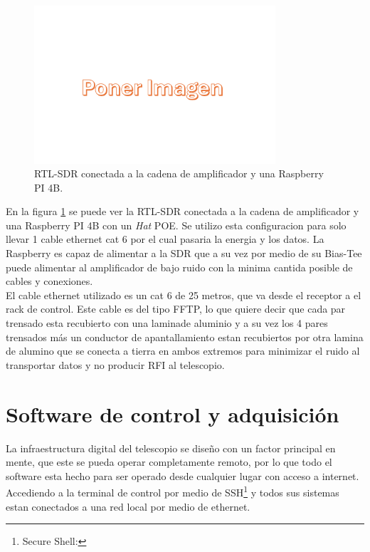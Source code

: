 \begin{figure}
    \centering
    \includegraphics[width=0.8\textwidth]{img/imagen}
    \caption{RTL-SDR conectada a la cadena de amplificador y una Raspberry PI 4B.}
    \label{fig:digitalizador}
\end{figure}

En la figura \ref{fig:digitalizador} se puede ver la RTL-SDR conectada a la cadena de amplificador y una Raspberry PI 4B con un \textit{Hat} POE. Se utilizo esta configuracion para solo llevar 1 cable ethernet cat 6 por el cual pasaria la energia y los datos. La Raspberry es capaz de alimentar a la SDR que a su vez por medio de su Bias-Tee puede alimentar al amplificador de bajo ruido con la minima cantida posible de cables y conexiones.\\

El cable ethernet utilizado es un cat 6 de 25 metros, que va desde el receptor a el rack de control. Este cable es del tipo FFTP, lo que quiere decir que cada par trensado esta recubierto con una laminade aluminio y a su vez los 4 pares trensados más un conductor de apantallamiento estan recubiertos por otra lamina de alumino que se conecta a tierra en ambos extremos para minimizar el ruido al transportar datos y no producir RFI al telescopio.\\

\section{Software de control y adquisición} \label{sec:software}

La infraestructura digital del telescopio se diseño con un factor principal en mente, que este se pueda operar completamente remoto, por lo que todo el software esta hecho para ser operado desde cualquier lugar con acceso a internet. Accediendo a la terminal de control por medio de SSH\footnote{Secure Shell: } y todos sus sistemas estan conectados a una red local por medio de ethernet.\\


